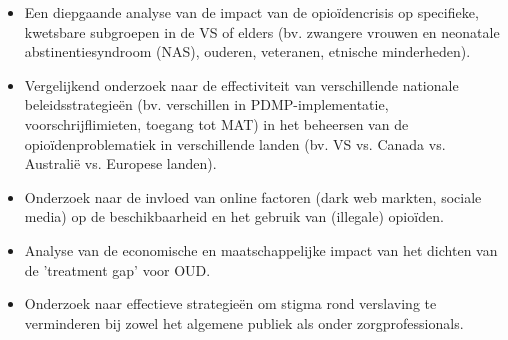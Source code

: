 \documentclass[11pt, a4paper]{report} %
\begin{document}
\begin{itemize}
        \begin{itemize}
            \item Een diepgaande analyse van de impact van de opioïdencrisis op specifieke, kwetsbare subgroepen in de VS of elders (bv. zwangere vrouwen en neonatale abstinentiesyndroom (NAS), ouderen, veteranen, etnische minderheden).
            \item Vergelijkend onderzoek naar de effectiviteit van verschillende nationale beleidsstrategieën (bv. verschillen in PDMP-implementatie, voorschrijflimieten, toegang tot MAT) in het beheersen van de opioïdenproblematiek in verschillende landen (bv. VS vs. Canada vs. Australië vs. Europese landen).
            \item Onderzoek naar de invloed van online factoren (dark web markten, sociale media) op de beschikbaarheid en het gebruik van (illegale) opioïden.
            \item Analyse van de economische en maatschappelijke impact van het dichten van de 'treatment gap' voor OUD.
            \item Onderzoek naar effectieve strategieën om stigma rond verslaving te verminderen bij zowel het algemene publiek als onder zorgprofessionals.
        \end{itemize}
\end{itemize}


\cleardoublepage
\printbibliography[title={Literatuurlijst}] %

\end{document}
